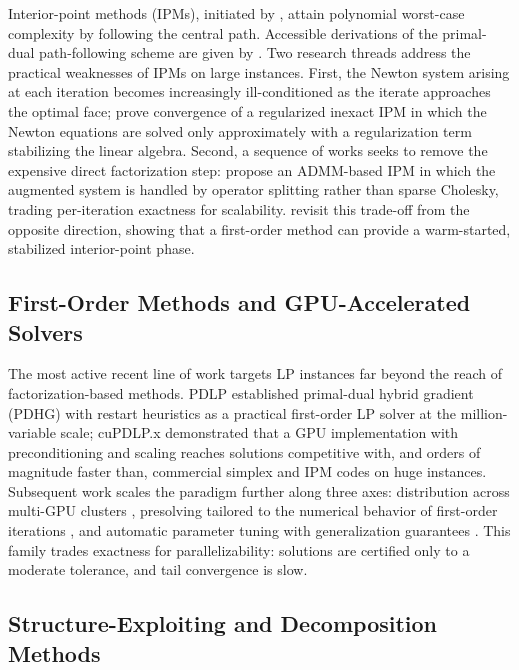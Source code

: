 Interior-point methods (IPMs), initiated by \citet{karmarkar1984new}, attain polynomial worst-case complexity by following the central path. Accessible derivations of the primal-dual path-following scheme are given by \citet{mehlhorn2015ipm}. Two research threads address the practical weaknesses of IPMs on large instances. First, the Newton system arising at each iteration becomes increasingly ill-conditioned as the iterate approaches the optimal face; \citet{cornelis2021regularized} prove convergence of a regularized inexact IPM in which the Newton equations are solved only approximately with a regularization term stabilizing the linear algebra. Second, a sequence of works seeks to remove the expensive direct factorization step: \citet{lin2018admm} propose an ADMM-based IPM in which the augmented system is handled by operator splitting rather than sparse Cholesky, trading per-iteration exactness for scalability. \citet{rothberg2026hybrid} revisit this trade-off from the opposite direction, showing that a first-order method can provide a warm-started, stabilized interior-point phase.

\subsection{First-Order Methods and GPU-Accelerated Solvers}
\label{sec:rw-fo}

The most active recent line of work targets LP instances far beyond the reach of factorization-based methods. PDLP \citep{applegate2025pdlp} established primal-dual hybrid gradient (PDHG) with restart heuristics as a practical first-order LP solver at the million-variable scale; cuPDLP.x \citep{lu2025cupdlpx} demonstrated that a GPU implementation with preconditioning and scaling reaches solutions competitive with, and orders of magnitude faster than, commercial simplex and IPM codes on huge instances. Subsequent work scales the paradigm further along three axes: distribution across multi-GPU clusters \citep{li2026dpdlp}, presolving tailored to the numerical behavior of first-order iterations \citep{cederberg2026presolve}, and automatic parameter tuning with generalization guarantees \citep{prasad2026tuning}. This family trades exactness for parallelizability: solutions are certified only to a moderate tolerance, and tail convergence is slow.

\subsection{Structure-Exploiting and Decomposition Methods}
\label{sec:rw-structure}

